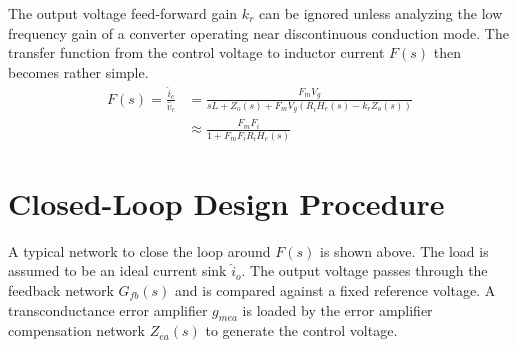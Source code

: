 \documentclass{tufte-handout}
\begin{document}
The output voltage feed-forward gain $k_r$ can be ignored unless analyzing the low frequency gain of a converter operating near discontinuous conduction mode. The transfer function from the control voltage to inductor current $F(s)$ then becomes rather simple.
\begin{align*}
F(s)=\frac{\widehat{i}_c}{\widehat{v}_c}&=\frac{F_mV_g}{sL+Z_o(s)+F_mV_g(R_iH_e(s)-k_rZ_o(s))}\\[0.75em]
&\approx\frac{F_mF_i}{1+F_mF_iR_iH_e(s)}
\end{align*}

\section{Closed-Loop Design Procedure}

\begin{fullwidth}
\end{fullwidth}

A typical network to close the loop around $F(s)$ is shown above. The load is assumed to be an ideal current sink $\widehat{i}_o$.
The output voltage passes through the feedback network $G_{fb}(s)$ and is compared against a fixed reference voltage.
A transconductance error amplifier $g_{mea}$ is loaded by the error amplifier compensation network $Z_{ea}(s)$ to generate the control voltage.
\end{document}

